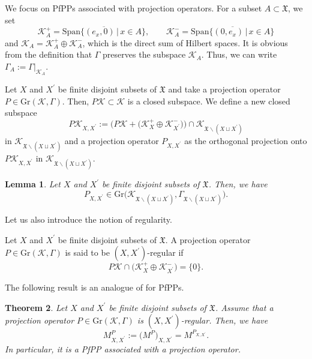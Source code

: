 \documentclass[pdftex]{sigma}
\numberwithin{equation}{section}
\newtheorem{Theorem}{Theorem}[section]
\newtheorem{Lemma}[Theorem]{Lemma}
\newcommand{\pr}[1]{#1^{\prime}}
\newcommand{\mfrak}[1]{\mathfrak{#1}}
\newcommand{\mcal}[1]{\mathcal{#1}}
\newcommand{\mrm}[1]{\mathrm{#1}}
\begin{document}
We focus on PfPPs associated with projection operators.
For a subset $A\subset\mfrak{X}$, we set
\begin{equation*}
	\mcal{K}_{A}^{+}=\overline{\mrm{Span}\{(e_{x},0)\,|\,x\in A\}},\qquad \mcal{K}^{-}_{A}=\overline{\mrm{Span}\{(0,e_{x})\,|\,x\in A\}}
\end{equation*}
and $\mcal{K}_{A}=\mcal{K}_{A}^{+}\oplus\mcal{K}_{A}^{-}$, which is the direct sum of Hilbert spaces.
It is obvious from the definition that $\Gamma$ preserves the subspace $\mcal{K}_{A}$. Thus, we can write $\Gamma_{A}:=\Gamma|_{\mcal{K}_{A}}$.

Let $X$ and $\pr{X}$ be finite disjoint subsets of $\mfrak{X}$ and take a projection operator $P\in \mrm{Gr}(\mcal{K},\Gamma)$.
Then, $P\mcal{K}\subset\mcal{K}$ is a closed subspace. We define a new closed subspace
\begin{equation*}
	P\mcal{K}_{X,\pr{X}}:=\big(P\mcal{K}+\big(\mcal{K}_{X}^{+}\oplus \mcal{K}^{-}_{\pr{X}}\big)\big)\cap \mcal{K}_{\mfrak{X}\backslash (X\sqcup\pr{X})}
\end{equation*}
in $\mcal{K}_{\mfrak{X}\backslash (X\sqcup\pr{X})}$ and a projection operator $P_{X,\pr{X}}$ as the orthogonal projection onto $P\mcal{K}_{X,\pr{X}}$ in $\mcal{K}_{\mfrak{X}\backslash (X\sqcup\pr{X})}$.

\begin{Lemma}\label{lem:conditional_projection}
Let $X$ and $\pr{X}$ be finite disjoint subsets of $\mfrak{X}$. Then, we have
\begin{equation*}
	P_{X,\pr{X}}\in\mrm{Gr}\big(\mcal{K}_{\mfrak{X}\backslash(X\sqcup\pr{X})},\Gamma_{\mfrak{X}\backslash (X\sqcup\pr{X})}\big).
\end{equation*}
\end{Lemma}

 Let us also introduce the notion of regularity.
 \begin{Definition} Let $X$ and $\pr{X}$ be finite disjoint subsets of $\mfrak{X}$.
 A projection operator $P\in \mrm{Gr}(\mcal{K},\Gamma)$ is said to be $(X,\pr{X})$-regular if
 \begin{equation*}
 	P\mcal{K}\cap \big(\mcal{K}_{X}^{+}\oplus \mcal{K}_{\pr{X}}^{-}\big)=\{0\}.
 \end{equation*}
 \end{Definition}

 The following result is an analogue of \cite[Proposition~6.13]{Olshanski2020} for PfPPs.
 \begin{Theorem}\label{thm:conditional_projection}
 Let $X$ and $\pr{X}$ be finite disjoint subsets of $\mfrak{X}$.
 Assume that a projection operator $P\in\mrm{Gr}(\mcal{K},\Gamma)$ is $(X,\pr{X})$-regular.
 Then, we have
 \begin{equation*}
 	M^{P}_{X,\pr{X}}:=\big(M^{P}\big)_{X,\pr{X}}=M^{P_{X,\pr{X}}}.
 \end{equation*}
 In particular, it is a PfPP associated with a projection operator.
 \end{Theorem}
\end{document}
